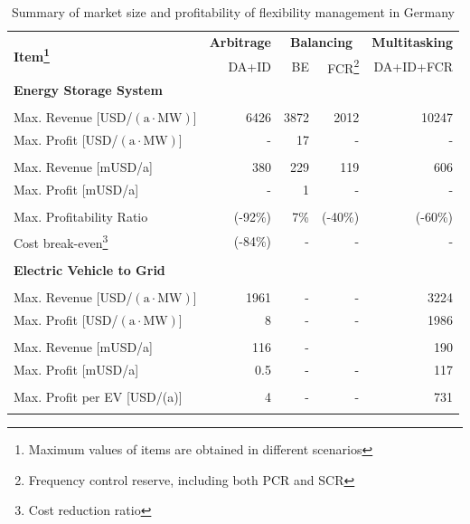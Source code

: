 \begin{table}
	\centering
	\begin{tabular}{l r r r r}
		\hline
		\multirow{2}{*}{\textbf{Item\footnote{Maximum values of items are obtained in different scenarios}}}& \textbf{Arbitrage} & \multicolumn{2}{c}{\textbf{Balancing}} & \textbf{Multitasking} \\
		\multirow{2}{*}{}& DA+ID & BE & FCR\footnote{Frequency control reserve, including both PCR and SCR} & DA+ID+FCR \\
		\hline
		\multicolumn{5}{l}{\textbf{Energy Storage System}} \\
		& & & & \\
		Max. Revenue [USD/$(\text{a} \cdot \text{MW})$] & \num{6426} & \num{3872} & \num{2012} & \num{10247} \\
		Max. Profit [USD/$(\text{a} \cdot \text{MW})$] & - & 17 & - & - \\
		& & & & \\
		Max. Revenue [mUSD/a] & \num{380} & \num{229} & \num{119} & \num{606} \\
		Max. Profit [mUSD/a] & - & 1 & - & - \\
		& & & & \\
		Max. Profitability Ratio & (-92\%) & 7\% & (-40\%) & (-60\%) \\
		Cost break-even\footnote{Cost reduction ratio} & (-84\%) & - &- & -\\
		& & & &\\
		\hline
		\multicolumn{5}{l}{\textbf{Electric Vehicle to Grid}} \\
		& & & & \\
		Max. Revenue [USD/$(\text{a} \cdot \text{MW})$] & \num{1961} & - & - & \num{3224} \\
		Max. Profit [USD/$(\text{a} \cdot \text{MW})$] & 8 & - & - & \num{1986} \\
		& & & & \\
		Max. Revenue [mUSD/a] & \num{116} & - & \- & \num{190} \\
		Max. Profit [mUSD/a] & \num{0.5} & - & - & 117 \\
		& & & & \\
		Max. Profit per EV [USD/(a)] & \num{4} & - & - & \num{731} \\
		& & & &\\
		\hline
	\end{tabular}
	\caption{Summary of market size and profitability of flexibility management in Germany}\label{tab:germany-summary}
\end{table}

